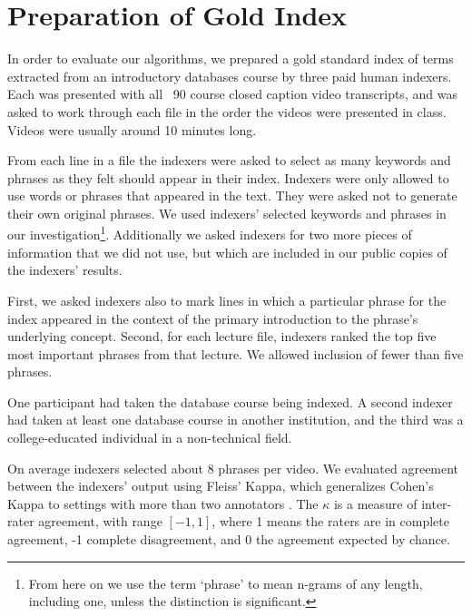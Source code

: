 \section{Preparation of Gold Index}
\label{sec:gold}


In order to evaluate our algorithms, we prepared a gold standard index
of terms extracted from an introductory databases course by three paid
human indexers. Each was presented with all ~90 course closed caption
video transcripts, and was asked to work through each file in the
order the videos were presented in class. Videos were usually around
10 minutes long.

From each line in a file the indexers were asked to select as many
keywords and phrases as they felt should appear in their
index. Indexers were only allowed to use words or phrases that
appeared in the text. They were asked not to generate their own
original phrases. We used indexers' selected keywords and phrases in
our investigation\footnote{From here on we use the term `phrase' to
  mean n-grams of any length, including one, unless the distinction is
  significant.}. Additionally we asked indexers for two more pieces of
information that we did not use, but which are included in our public
copies of the indexers' results.

First, we asked indexers also to mark lines in which a particular
phrase for the index appeared in the context of the primary
introduction to the phrase's underlying concept.  Second, for each
lecture file, indexers ranked the top five most important phrases from
that lecture. We allowed inclusion of fewer than five phrases.

One participant had taken the database course being indexed. A second
indexer had taken at least one database course in another institution,
and the third was a college-educated individual in a non-technical
field.

On average indexers selected about 8 phrases per video.  We evaluated
agreement between the indexers' output using Fleiss' Kappa, which
generalizes Cohen's Kappa to settings with more than two annotators
\cite{fleiss1971measuring}. The $\kappa$ is a measure of inter-rater
agreement, with range $[-1, 1]$, where 1 means the raters are in
complete agreement, -1 complete disagreement, and 0 the agreement
expected by chance.

